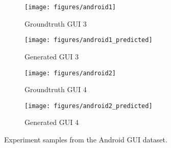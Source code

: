 \documentclass{article}
\begin{document}
\begin{figure}[H]
    \begin{subfigure}{.245\textwidth}
        \centering
        \texttt{[image: figures/android1]}
        \caption{Groundtruth GUI 3}
    \end{subfigure}
    \begin{subfigure}{.245\textwidth}
        \centering
        \texttt{[image: figures/android1\_predicted]}
        \caption{Generated GUI 3}
    \end{subfigure}
    \begin{subfigure}{.245\textwidth}
        \centering
        \texttt{[image: figures/android2]}
        \caption{Groundtruth GUI 4}
    \end{subfigure}
    \begin{subfigure}{.245\textwidth}
        \centering
        \texttt{[image: figures/android2\_predicted]}
        \caption{Generated GUI 4}
    \end{subfigure}
    \caption{Experiment samples from the Android GUI dataset.}
    \label{fig:samples_android}
\end{figure}



\end{document}
